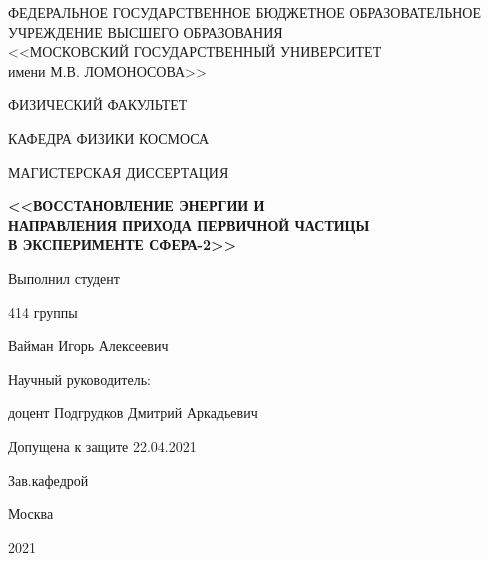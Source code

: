 \thispagestyle{empty}

\begin{center}
ФЕДЕРАЛЬНОЕ ГОСУДАРСТВЕННОЕ БЮДЖЕТНОЕ ОБРАЗОВАТЕЛЬНОЕ\\
УЧРЕЖДЕНИЕ ВЫСШЕГО ОБРАЗОВАНИЯ\\
<<МОСКОВСКИЙ ГОСУДАРСТВЕННЫЙ УНИВЕРСИТЕТ \\
имени М.В. ЛОМОНОСОВА>>\\

\vspace{5mm}

ФИЗИЧЕСКИЙ ФАКУЛЬТЕТ 

\vspace{5mm}

КАФЕДРА ФИЗИКИ КОСМОСА
\end{center}

\vfill
\begin{center}
{МАГИСТЕРСКАЯ ДИССЕРТАЦИЯ}
\end{center}


\begin{center}
{\bf <<ВОССТАНОВЛЕНИЕ ЭНЕРГИИ И \\НАПРАВЛЕНИЯ ПРИХОДА ПЕРВИЧНОЙ ЧАСТИЦЫ \\В ЭКСПЕРИМЕНТЕ СФЕРА-2>>
\par}

\end{center}

\vfill

\begin{flushright}
Выполнил студент

414 группы

Вайман Игорь Алексеевич

\vspace{15mm}

Научный руководитель:

доцент Подгрудков Дмитрий Аркадьевич
\end{flushright}

\vspace{10mm}

\begin{flushleft}
Допущена к защите 22.04.2021

Зав.кафедрой  

\end{flushleft}
\vfill
\begin{center}
Москва

2021
\end{center}

\newpage